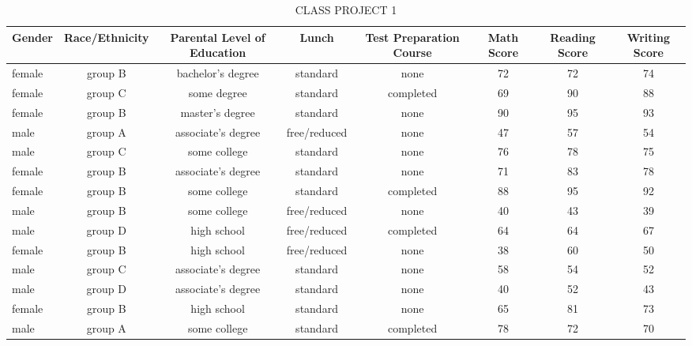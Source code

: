 \documentclass{article}
\begin{document}
	\begin{sidewaystable}[h!]
		\caption{CLASS PROJECT 1}
		\label{tab:table}
		\begin{small}
		\begin{tabular}{|l|c|c|c|c|c|c|c}
\textbf{Gender} & \textbf{Race/Ethnicity} & \textbf{Parental Level of Education} & \textbf{Lunch} & \textbf{Test Preparation Course} & \textbf{Math Score} & \textbf{Reading Score} & \textbf{Writing Score}\\
\hline
female & group B & bachelor's degree & standard & none & 72 & 72 & 74\\
female & group C & some degree & standard & completed & 69 & 90 & 88\\
female & group B & master's degree & standard & none & 90 & 95 & 93\\
male & group A & associate's degree & free/reduced & none & 47 & 57 & 54\\
male & group C & some college & standard & none & 76 & 78 & 75\\
female & group B & associate's degree & standard & none & 71 & 83 & 78\\
female & group B & some college & standard & completed & 88 & 95 & 92\\
male & group B & some college & free/reduced & none & 40 & 43 & 39\\
male & group D & high school & free/reduced & completed & 64 & 64 & 67\\
female & group B & high school & free/reduced & none & 38 & 60 & 50\\
male & group C & associate's degree & standard & none & 58 & 54 & 52\\
male & group D  & associate's degree & standard & none & 40 & 52 & 43\\
female & group B & high school & standard & none & 65 & 81 & 73\\
male & group A & some college & standard & completed & 78 & 72 & 70\\
			
		\end{tabular}
	\end{small}
\end{sidewaystable}
\end{document}

